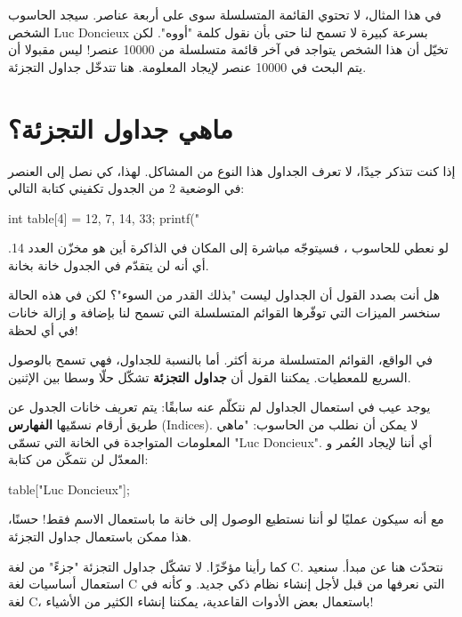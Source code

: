 في هذا المثال، لا تحتوي القائمة المتسلسلة سوى على أربعة عناصر. سيجد الحاسوب الشخص 
\textenglish{Luc Doncieux}
بسرعة كبيرة لا تسمح لنا حتى بأن نقول كلمة "أووه". لكن تخيّل أن هذا الشخص يتواجد في آخر قائمة متسلسلة من 10000 عنصر! ليس مقبولا أن يتم البحث في 10000 عنصر لإيجاد المعلومة. هنا تتدخّل جداول التجزئة.

\section{ماهي جداول التجزئة؟}

إذا كنت تتذكر جيدًا، لا تعرف الجداول هذا النوع من المشاكل. لهذا، كي نصل إلى العنصر في الوضعية 2 من الجدول تكفيني كتابة التالي:

\begin{Csource}
int table[4] = {12, 7, 14, 33};
printf("%
\end{Csource}

لو نعطي للحاسوب
،
فسيتوجّه مباشرة إلى المكان في الذاكرة أين هو مخزّن العدد 14. أي أنه لن يتقدّم في الجدول خانة بخانة.

\begin{question}
هل أنت بصدد القول أن الجداول ليست "بذلك القدر من السوء"؟ لكن في هذه الحالة سنخسر الميزات التي توفّرها القوائم المتسلسلة التي تسمح لنا بإضافة و إزالة خانات في أي لحظة!
\end{question}

في الواقع، القوائم المتسلسلة مرنة أكثر. أما بالنسبة للجداول، فهي تسمح بالوصول السريع للمعطيات. يمكننا القول أن 
\textbf{جداول التجزئة}
تشكّل حلّا وسطا بين الإثنين.

يوجد عيب في استعمال الجداول لم نتكلّم عنه سابقًا: يتم تعريف خانات الجدول عن طريق أرقام نسمّيها 
\textbf{الفهارس}
(\textenglish{Indices}).
لا يمكن أن نطلب من الحاسوب: "ماهي المعلومات المتواجدة في الخانة التي تسمّى
"\textenglish{Luc Doncieux}".
أي أننا لإيجاد العُمر و المعدّل لن نتمكّن من كتابة:

\begin{Csource}
table["Luc Doncieux"];
\end{Csource}

مع أنه سيكون عمليًا لو أننا نستطيع الوصول إلى خانة ما باستعمال الاسم فقط! حسنًا، هذا ممكن باستعمال جداول التجزئة.

\begin{information}
كما رأينا مؤخّرًا. لا تشكّل جداول التجزئة "جزءً" من لغة \textenglish{C}.
نتحدّث هنا عن مبدأ. سنعيد استعمال أساسيات لغة \textenglish{C}
التي نعرفها من قبل لأجل إنشاء نظام ذكي جديد. و كأنه في لغة \textenglish{C}،
باستعمال بعض الأدوات القاعدية، يمكننا إنشاء الكثير من الأشياء!
\end{information}

